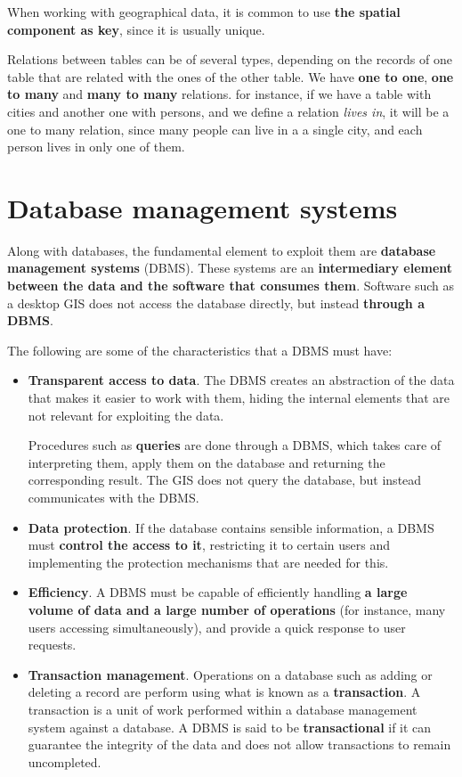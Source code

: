 When working with geographical data, it is common to use \textbf{the spatial component as key}, since it is usually unique.

Relations between tables can be of several types, depending on the records of one table that are related with the ones of the other table. We have \textbf{one to one}, \textbf{one to many} and \textbf{many to many} relations. for instance, if we have a table with cities and another one with persons, and we define a relation \emph{lives in}, it will be a one to many relation, since many people can live in a a single city, and each person lives in only one of them.


\section{Database management systems}

Along with databases, the fundamental element to exploit them are \textbf{database management systems} (DBMS). These systems are an \textbf{intermediary element between the data and the software that consumes them}. Software such as a desktop GIS does not access the database directly, but instead \textbf{through a DBMS}.

The following are some of the characteristics that a DBMS must have:

\begin{itemize}
	\item \textbf{Transparent access to data}. The DBMS creates an abstraction of the data that makes it easier to work with them, hiding the internal elements that are not relevant for exploiting the data.

	Procedures such as \textbf{queries} are done through a DBMS, which takes care of interpreting them, apply them on the database and returning the corresponding result. The GIS does not query the database, but instead communicates with the DBMS.
	\item \textbf{Data protection}. If the database contains sensible information, a DBMS must \textbf{control the access to it}, restricting it to certain users and implementing the protection mechanisms that are needed for this.
	\item \textbf{Efficiency}. A DBMS must be capable of efficiently handling \textbf{a large volume of data and a large number of operations} (for instance, many users accessing simultaneously), and provide a quick response to user requests.
	\item \textbf{Transaction management}. Operations on a database such as adding or deleting a record are perform using what is known as a \textbf{transaction}. A transaction is a unit of work performed within a database management system against a database. A DBMS is said to be \textbf{transactional} if it can guarantee the integrity of the data and does not allow transactions to remain uncompleted. 

\end{itemize}

